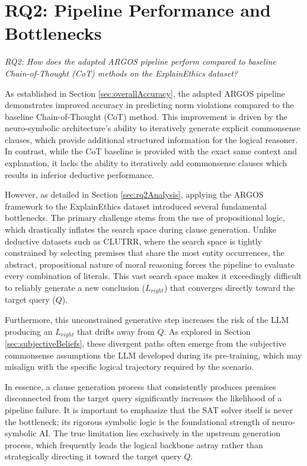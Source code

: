\section{RQ2: Pipeline Performance and Bottlenecks}
\label{sec:conclusionRq2}
\textit{RQ2: How does the adapted ARGOS pipeline perform compared to baseline Chain-of-Thought (CoT) methods on the ExplainEthics dataset?}


As established in Section \ref{sec:overallAccuracy}, the adapted ARGOS pipeline demonstrates improved accuracy in predicting norm violations compared to the baseline Chain-of-Thought (CoT) method. This improvement is driven by the neuro-symbolic architecture's ability to iteratively generate explicit commonsense clauses, which provide additional structured information for the logical reasoner. In contrast, while the CoT baseline is provided with the exact same context and explanation, it lacks the ability to iteratively add commonsense clauses which results in inferior deductive performance.

However, as detailed in Section \ref{sec:rq2Analysis}, applying the ARGOS framework to the ExplainEthics dataset introduced several fundamental bottlenecks. The primary challenge stems from the use of propositional logic, which drastically inflates the search space during clause generation. Unlike deductive datasets such as CLUTRR, where the search space is tightly constrained by selecting premises that share the most entity occurrences, the abstract, propositional nature of moral reasoning forces the pipeline to evaluate every combination of literals. This vast search space makes it exceedingly difficult to reliably generate a new conclusion ($L_{right}$) that converges directly toward the target query ($Q$).

Furthermore, this unconstrained generative step increases the risk of the LLM producing an $L_{right}$ that drifts away from $Q$. As explored in Section \ref{sec:subjectiveBeliefs}, these divergent paths often emerge from the subjective commonsense assumptions the LLM developed during its pre-training, which may misalign with the specific logical trajectory required by the scenario. 

In essence, a clause generation process that consistently produces premises disconnected from the target query significantly increases the likelihood of a pipeline failure. It is important to emphasize that the SAT solver itself is never the bottleneck; its rigorous symbolic logic is the foundational strength of neuro-symbolic AI. The true limitation lies exclusively in the upstream generation process, which frequently leads the logical backbone astray rather than strategically directing it toward the target query $Q$.

